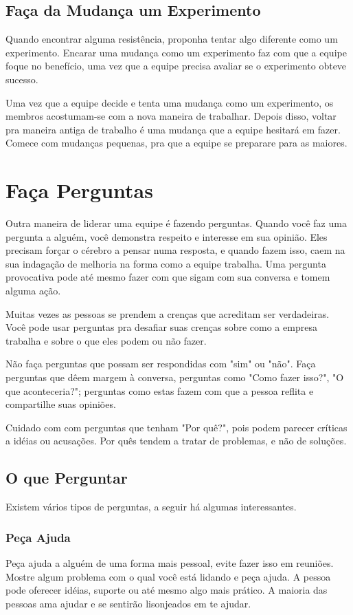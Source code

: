\documentclass[a4paper, 10pt, font=plain]{abnt}
\begin{document}
\subsection{Faça da Mudança um Experimento}
Quando encontrar alguma resistência, proponha tentar algo diferente como um experimento. Encarar uma mudança como um experimento faz com que a equipe foque no benefício, uma vez que a equipe precisa avaliar se o experimento obteve sucesso.

Uma vez que a equipe decide e tenta uma mudança como um experimento, os membros acostumam-se com a nova maneira de trabalhar. Depois disso, voltar pra maneira antiga de trabalho é uma mudança que a equipe hesitará em fazer. Comece com mudanças pequenas, pra que a equipe se preparare para as maiores.

\section{Faça Perguntas}
Outra maneira de liderar uma equipe é fazendo perguntas. Quando você faz uma pergunta a alguém, você demonstra respeito e interesse em sua opinião. Eles precisam forçar o cérebro a pensar numa resposta, e quando fazem isso, caem na sua indagação de melhoria na forma como a equipe trabalha. Uma pergunta provocativa pode até mesmo fazer com que sigam com sua conversa e tomem alguma ação.

Muitas vezes as pessoas se prendem a crenças que acreditam ser verdadeiras. Você pode usar perguntas pra desafiar suas crenças sobre como a empresa trabalha e sobre o que eles podem ou não fazer.

Não faça perguntas que possam ser respondidas com "sim" ou "não". Faça perguntas que dêem margem à conversa, perguntas como "Como fazer isso?", "O que aconteceria?"; perguntas como estas fazem com que a pessoa reflita e compartilhe suas opiniões.

Cuidado com com perguntas que tenham "Por quê?", pois podem parecer críticas a idéias ou acusações. Por quês tendem a tratar de problemas, e não de soluções.

\subsection{O que Perguntar}
Existem vários tipos de perguntas, a seguir há algumas interessantes.

\subsubsection{Peça Ajuda}
Peça ajuda a alguém de uma forma mais pessoal, evite fazer isso em reuniões. Mostre algum problema com o qual você está lidando e peça ajuda. A pessoa pode oferecer idéias, suporte ou até mesmo algo mais prático. A maioria das pessoas ama ajudar e se sentirão lisonjeados em te ajudar.
\end{document}
